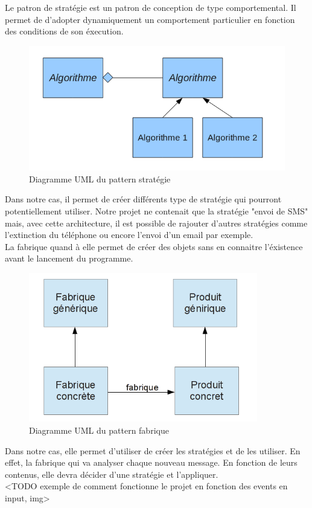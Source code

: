 Le patron de stratégie est un patron de conception de type comportemental. Il permet de d'adopter 
dynamiquement un comportement particulier en fonction des conditions de son éxecution.

\begin{figure}[H]
	\center
	\includegraphics[width=12cm]{img/pattern-strategie.png}
	\caption{Diagramme UML du pattern stratégie}
\end{figure}

Dans notre cas, il permet de créer différents type de stratégie qui pourront potentiellement utiliser. 
Notre projet ne contenait que la stratégie "envoi de SMS" mais, avec cette architecture, il est possible 
de rajouter d'autres stratégies comme l'extinction du téléphone ou encore l'envoi d'un email par exemple.
\\


La fabrique quand à elle permet de créer des objets sans en connaitre l'éxistence avant le lancement du 
programme.

\begin{figure}[H]
	\center
	\includegraphics[width=10cm]{img/fabrique.png}
	\caption{Diagramme UML du pattern fabrique}
\end{figure}

Dans notre cas, elle permet d'utiliser de créer les stratégies et de les utiliser. En effet, la fabrique 
qui va analyser chaque nouveau message. En fonction de leurs contenus, elle devra décider d'une stratégie
et l'appliquer.
\\
<TODO exemple de comment fonctionne le projet en fonction des events en input, img>



